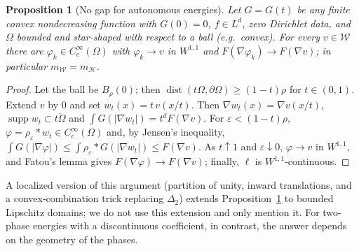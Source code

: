 \documentclass[11pt]{amsart}
\newtheorem{proposition}[theorem]{Proposition}
\theoremstyle{definition}
\theoremstyle{remark}
\numberwithin{equation}{section}
\newcommand{\abs}[1]{\lvert #1\rvert}
\newcommand{\Wc}{\mathcal W}
\newcommand{\mW}{m_{\mathcal W}}
\newcommand{\mH}{m_{\mathcal H}}
\begin{document}
\begin{proposition}[No gap for autonomous energies]\label{prop:auto}
Let $G=G(t)$ be any finite convex nondecreasing function with $G(0)=0$, $f\in L^d$, zero Dirichlet data, and $\Omega$ bounded and star-shaped with respect to a ball \textup(e.g.\ convex\textup). For every $v\in\Wc$ there are $\varphi_k\in C^\infty_c(\Omega)$ with $\varphi_k\to v$ in $W^{1,1}$ and $F(\nabla\varphi_k)\to F(\nabla v)$; in particular $\mW=\mH$.
\end{proposition}
\begin{proof}
Let the ball be $B_\rho(0)$; then $\operatorname{dist}(t\Omega,\partial\Omega)\ge(1-t)\rho$ for $t\in(0,1)$. Extend $v$ by $0$ and set $w_t(x)=t\,v(x/t)$. Then $\nabla w_t(x)=\nabla v(x/t)$, $\operatorname{supp}w_t\subset\overline{t\Omega}$ and $\int G(\abs{\nabla w_t})=t^dF(\nabla v)$. For $\varepsilon<(1-t)\rho$, $\varphi=\rho_\varepsilon*w_t\in C^\infty_c(\Omega)$ and, by Jensen's inequality, $\int G(\abs{\nabla\varphi})\le\int\rho_\varepsilon*G(\abs{\nabla w_t})\le F(\nabla v)$. As $t\uparrow1$ and $\varepsilon\downarrow0$, $\varphi\to v$ in $W^{1,1}$, and Fatou's lemma gives $F(\nabla\varphi)\to F(\nabla v)$; finally, $\ell$ is $W^{1,1}$-continuous.
\end{proof}
A localized version of this argument (partition of unity, inward translations, and a convex-combination trick replacing $\Delta_2$) extends Proposition~\ref{prop:auto} to bounded Lipschitz domains; we do not use this extension and only mention it. For two-phase energies with a discontinuous coefficient, in contrast, the answer depends on the geometry of the phases.
\end{document}
